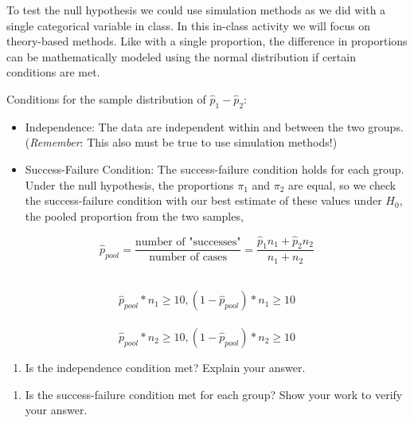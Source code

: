 \documentclass[
]{report}
\providecommand{\tightlist}{%
  \setlength{\itemsep}{0pt}\setlength{\parskip}{0pt}}
\begin{document}
To test the null hypothesis we could use simulation methods as we did with a single categorical variable in class. In this in-class activity we will focus on theory-based methods. Like with a single proportion, the difference in proportions can be mathematically modeled using the normal distribution if certain conditions are met.

Conditions for the sample distribution of \(\hat{p}_1-\hat{p}_2\):

\begin{itemize}
\item
  Independence: The data are independent within and between the two groups. (\emph{Remember}: This also must be true to use simulation methods!)
\item
  Success-Failure Condition: The success-failure condition holds for each group. Under the null hypothesis, the proportions \(\pi_1\) and \(\pi_2\) are equal, so we check the success-failure condition with our best estimate of these values under \(H_0\), the pooled proportion from the two samples,
\end{itemize}

\[
\hat{p}_{pool} = \frac{\text{number of "successes"}}{\text{number of cases}} = \frac{\hat{p}_1 n_1+\hat{p}_2 n_2}{n_1+n_2}
\]

~~~~\[\hat{p}_{pool} * n_1 \ge 10, (1 - \hat{p}_{pool}) * n_1 \ge 10\]\\
\hspace*{0.333em}\hspace*{0.333em}\hspace*{0.333em}\hspace*{0.333em}\[\hat{p}_{pool} * n_2 \ge 10, (1 - \hat{p}_{pool}) * n_2 \ge 10\]

\vspace{.25in}

\begin{enumerate}
\def\labelenumi{\arabic{enumi}.}
\setcounter{enumi}{14}
\tightlist
\item
  Is the independence condition met? Explain your answer.
\end{enumerate}

\vspace{0.5in}

\begin{enumerate}
\def\labelenumi{\arabic{enumi}.}
\setcounter{enumi}{15}
\tightlist
\item
  Is the success-failure condition met for each group? Show your work to verify your answer.
\end{enumerate}
\end{document}
